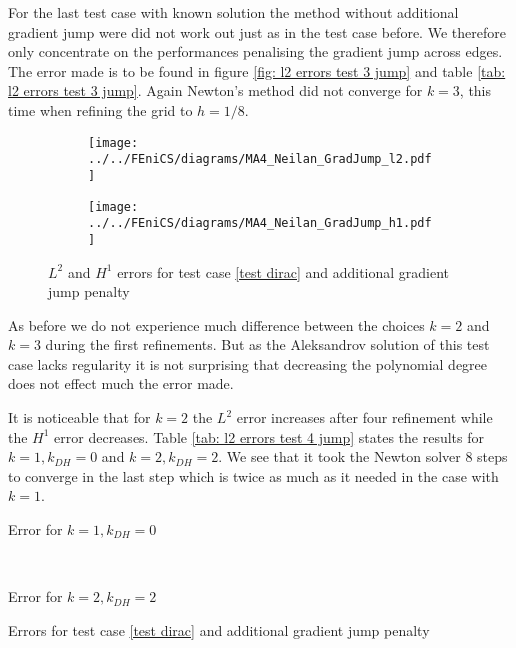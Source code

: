 
For the last test case with known solution the method without additional gradient jump were did not work out just as in the test case before. We therefore only concentrate on the performances penalising the gradient jump across edges. The error made is to be found in figure \ref{fig: l2 errors test 3 jump} and table \ref{tab: l2 errors test 3 jump}. Again Newton's method did not converge for $k=3$, this time when refining the grid to $h=1/8$. 
\begin{figure}[H]
	\centering
	\begin{subfigure}{\textwidth}
		\centering
		\texttt{[image: ../../FEniCS/diagrams/MA4\_Neilan\_GradJump\_l2.pdf]}
	\end{subfigure}
	
	\begin{subfigure}{\textwidth}
		\centering
		\texttt{[image: ../../FEniCS/diagrams/MA4\_Neilan\_GradJump\_h1.pdf]}
	\end{subfigure}
	\caption{$L^2$ and $H^1$ errors for test case \ref{test dirac} and additional gradient jump penalty}
	\label{fig: l2 errors test 4 jump}
\end{figure}
As before we do not experience much difference between the choices $k=2$ and $k=3$ during the first refinements. But as the Aleksandrov solution of this test case lacks regularity it is not surprising that decreasing the polynomial degree does not effect much the error made.

It is noticeable that for $k=2$ the $L^2$ error increases after four refinement while the $H^1$ error decreases. Table \ref{tab: l2 errors test 4 jump} states the results for $k=1, k_{DH}=0$ and $k=2, k_{DH}=2$. We see that it took the Newton solver 8 steps to converge in the last step which is twice as much as it needed in the case with $k=1$.
\begin{table}[H]
\begin{subtable}[b]{0.45\textwidth}
  	\centering
  	\pgfplotstabletypeset[columns={iterations, l2error, h1error,N},
  	every row 0 column 0/.style={set content=init},
  	]{\MAFourJumpdegOneZero}
  	\caption{Error for $k=1, k_{DH}=0$}
  \end{subtable}
  ~
	\begin{subtable}[b]{0.45\textwidth}
		\centering
		  		\pgfplotstabletypeset[
		columns={iterations, l2error, h1error,N},
		    every row 0 column 0/.style={set content=init},
		]{\MAFourJumpdegTwoTwo}
    	\caption{Error for $k=2, k_{DH}=2$}
   \end{subtable}
 	\caption{Errors for test case \ref{test dirac} and additional gradient jump penalty}
	\label{tab: l2 errors test 4 jump}
\end{table}
